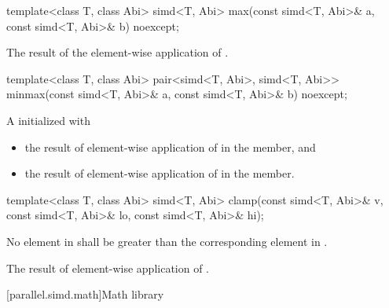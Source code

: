 \begin{itemdecl}
template<class T, class Abi> simd<T, Abi> max(const simd<T, Abi>& a, const simd<T, Abi>& b) noexcept;
\end{itemdecl}

\begin{itemdescr}
  \pnum\returns
  The result of the element-wise application of  \foralli.
\end{itemdescr}

\begin{itemdecl}
template<class T, class Abi>
  pair<simd<T, Abi>, simd<T, Abi>> minmax(const simd<T, Abi>& a, const simd<T, Abi>& b) noexcept;
\end{itemdecl}

\begin{itemdescr}
  \pnum\returns
  A  initialized with
  \begin{itemize}
    \item the result of element-wise application of  \foralli{} in the  member, and
    \item the result of element-wise application of  \foralli{} in the  member.
  \end{itemize}
\end{itemdescr}

\begin{itemdecl}
template<class T, class Abi> simd<T, Abi>
  clamp(const simd<T, Abi>& v, const simd<T, Abi>& lo, const simd<T, Abi>& hi);
\end{itemdecl}

\begin{itemdescr}
  \pnum\requires
  No element in  shall be greater than the corresponding element in .

  \pnum\returns
  The result of element-wise application of  \foralli.
\end{itemdescr}

[parallel.simd.math]{Math library}

